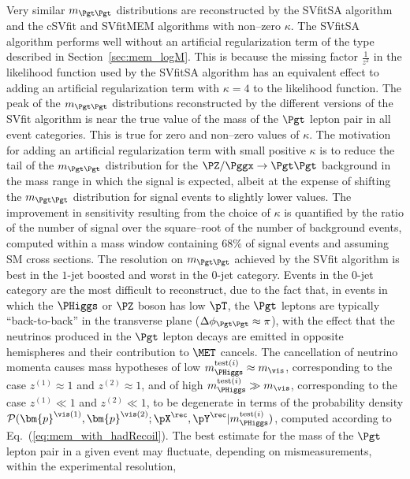 Very similar $m_{\Pgt\Pgt}$ distributions are reconstructed by the SVfitSA algorithm and the cSVfit and SVfitMEM algorithms with non--zero $\kappa$.
The SVfitSA algorithm performs well without an artificial regularization term of the type described in Section~\ref{sec:mem_logM}.
This is because the missing factor $\frac{1}{z^{2}}$ in the likelihood function used by the SVfitSA algorithm
has an equivalent effect to adding an artificial regularization term with $\kappa = 4$ to the likelihood function.
The peak of the $m_{\Pgt\Pgt}$ distributions reconstructed by the different versions of the SVfit algorithm is near the true value of the mass of the $\Pgt$ lepton pair
in all event categories.
This is true for zero and non--zero values of $\kappa$.
The motivation for adding an artificial regularization term with small
positive $\kappa$ is to reduce the tail of the $m_{\Pgt\Pgt}$ distribution for the
$\PZ/\Pggx \to \Pgt\Pgt$ background in the mass range in which the
signal is expected, albeit at the expense of shifting the $m_{\Pgt\Pgt}$ distribution for signal events
to slightly lower values.
The improvement in sensitivity resulting from the choice of $\kappa$ is quantified by the ratio of the number of signal over the square--root of the number of background events,
computed within a mass window containing $68\%$ of signal events and assuming SM cross sections.
The resolution on $m_{\Pgt\Pgt}$ achieved by the SVfit algorithm is best in the $1$-jet boosted and worst in the $0$-jet category.
Events in the $0$-jet category are the most difficult to reconstruct,
due to the fact that, in events in which the $\PHiggs$ or $\PZ$ boson has low $\pT$, 
the $\Pgt$ leptons are typically ``back-to-back'' in the transverse plane ($\Delta\phi_{\Pgt\Pgt} \approx \pi$),
with the effect that the neutrinos produced in the $\Pgt$ lepton decays are emitted in opposite hemispheres and their contribution to $\MET$ cancels.
The cancellation of neutrino momenta causes mass hypotheses of low $m_{\PHiggs}^{\textrm{test}(i)} \approx m_{\vis}$, corresponding to the case $z^{(1)} \approx 1$ and $z^{(2)} \approx 1$,
and of high $m_{\PHiggs}^{\textrm{test}(i)} \gg m_{\vis}$, corresponding to the case $z^{(1)} \ll 1$ and $z^{(2)} \ll 1$,
to be degenerate in terms of the probability density $\mathcal{P}(\bm{p}^{\vis(1)},\bm{p}^{\vis(2)};\pX^{\rec},\pY^{\rec}|m_{\PHiggs}^{\textrm{test}(i)})$,
computed according to Eq.~(\ref{eq:mem_with_hadRecoil}).
The best estimate for the mass of the $\Pgt$ lepton pair in a given event may fluctuate, 
depending on mismeasurements, within the experimental resolution, 
